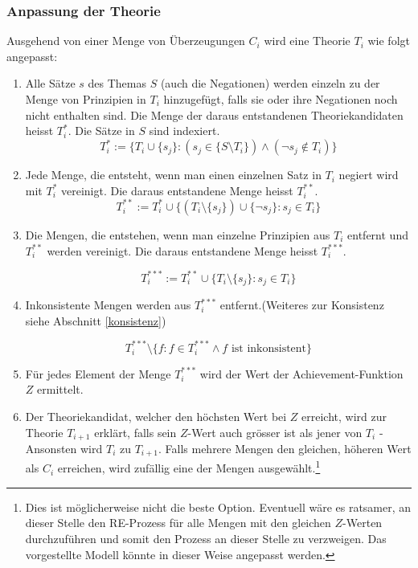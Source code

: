\documentclass{article}
\begin{document}
\subsubsection{Anpassung der Theorie} \label{T-Anpassung}
Ausgehend von einer Menge von Überzeugungen $C_i$ wird eine Theorie $T_i$ wie folgt angepasst: 
\begin{enumerate}
    \item \label{1} Alle Sätze $s$ des Themas $S$ (auch die Negationen) werden einzeln zu der Menge von Prinzipien in $T_i$ hinzugefügt, falls sie oder ihre Negationen noch nicht enthalten sind. Die Menge der daraus entstandenen Theoriekandidaten heisst $T_i^*$. Die Sätze in $S$ sind indexiert.
    $$ 
        T_i^*:= \{ T_i \cup \{s_j\}: (s_j \in \{S \setminus T_i\}) \land (\neg s_j \not\in T_i) \}
    $$
    \item \label{1.1} Jede Menge, die entsteht, wenn man einen einzelnen Satz in $T_i$ negiert wird mit $T_i^*$ vereinigt. Die daraus entstandene Menge heisst $T_i^{**}$.
    $$
        T_i^{**}:= T_i^* \cup \{ (T_i \setminus \{s_j\}) \cup \{\neg s_j\}: s_j \in T_i\}
    $$
    \item \label{2} Die Mengen, die entstehen, wenn man einzelne Prinzipien aus $T_i$ entfernt und $T_i^{**}$ werden vereinigt. Die daraus entstandene Menge heisst $T_i^{***}$.
    
    $$
        T_i^{***}:= T_i^{**} \cup \{ T_i \setminus \{s_j\}: s_j \in T_i\}
    $$
    
    \item \label{konsistenzfilter} Inkonsistente Mengen werden aus $T_i^{***}$ entfernt.(Weiteres zur Konsistenz siehe Abschnitt \ref{konsistenz})
    
    $$
        T_i^{***} \setminus \{f : f \in T_i^{***} \land f \text{ ist inkonsistent} \}
    $$
    \item \label{3} Für jedes Element der Menge $T_i^{***}$ wird der Wert der Achievement-Funktion $Z$ ermittelt.
    \item \label{4} Der Theoriekandidat, welcher den höchsten Wert bei $Z$ erreicht, wird zur Theorie $T_{i+1}$ erklärt, falls sein $Z$-Wert auch grösser ist als jener von $T_i$ - Ansonsten wird $T_i$ zu $T_{i+1}$. Falls mehrere Mengen den gleichen, höheren Wert als $C_i$ erreichen, wird zufällig eine der Mengen ausgewählt.\footnote{Dies ist möglicherweise nicht die beste Option. Eventuell wäre es ratsamer, an dieser Stelle den RE-Prozess für alle Mengen mit den gleichen $Z$-Werten durchzuführen und somit den Prozess an dieser Stelle zu verzweigen. Das vorgestellte Modell könnte in dieser Weise angepasst werden.}
\end{enumerate}
\end{document}
